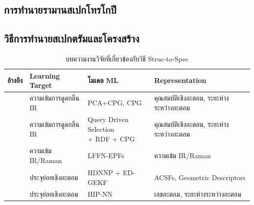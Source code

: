\subsection{การทำนายรามานสเปกโทรโกปี}
\label{ssec:pred_spec_raman}


\subsection{วิธีการทำนายสเปกตรัมและโครงสร้าง}
\label{ssec:pred_spec_struct}

\begin{table}[H]
    \centering
    \caption{บทความงานวิจัยที่เกี่ยวข้องกับวิธี Struc-to-Spec}
    \label{tab:struc2spec}
    \small
    \begin{tabular}{clll}
    \toprule
    \textbf{อ้างอิง} &\textbf{Learning Target} &\textbf{โมเดล ML} &\textbf{Representation} \\
    \midrule
    \autocite{schuur1996,Schuur1997} & ความเข้มการดูดกลืน IR & PCA+CPG\autocite{hecht-nielsen1987}, 
    CPG\autocite{hecht-nielsen1987} & คุณสมบัติเชิงอะตอม, ระยะห่างระหว่างอะตอม \\
    
    \autocite{selzer2000,kostka2001} & ความเข้มการดูดกลืน IR & \makecell[tl]{Query Driven Selection \\ + RDF + 
    CPG\autocite{hecht-nielsen1987}} & คุณสมบัติเชิงอะตอม, ระยะห่างระหว่างอะตอม \\
    
    \autocite{yildiz2011,yildiz2012} & ความเข้ม IR/Raman & LFFN-EPFs\autocite{yildiz2011} & ความเข้ม IR/Raman \\
    
    \autocite{gastegger2017} & ประจุย่อยเชิงอะตอม & HDNNP\autocite{behler2007} + ED-GEKF\autocite{gastegger2015} 
    & ACSFs\autocite{behler2011a}, Geometric Descriptors \\
    
    \autocite{sifain2018,nebgen2018} & ประจุย่อยเชิงอะตอม & HIP-NN\autocite{lubbers2018} & เลขอะตอม, 
    ระยะห่างระหว่างอะตอม \\
   \bottomrule
\end{tabular}
\end{table}

